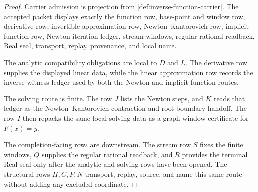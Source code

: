 \begin{proof}
Carrier admission is projection from \autoref{def:inverse-function-carrier}. The accepted packet displays exactly the function row, base-point and window row, derivative row, invertible approximation row, Newton--Kantorovich row, implicit-function row, Newton-iteration ledger, stream windows, regular rational readback, Real seal, transport, replay, provenance, and local name.

The analytic compatibility obligations are local to $D$ and $L$. The derivative row supplies the displayed linear data, while the linear approximation row records the inverse-witness ledger used by both the Newton and implicit-function routes.

The solving route is finite. The row $J$ lists the Newton steps, and $K$ reads that ledger as the Newton--Kantorovich contraction and root-boundary handoff. The row $I$ then repacks the same local solving data as a graph-window certificate for $F(x)=y$.

The completion-facing rows are downstream. The stream row $S$ fixes the finite windows, $Q$ supplies the regular rational readback, and $R$ provides the terminal Real seal only after the analytic and solving rows have been opened. The structural rows $H,C,P,N$ transport, replay, source, and name this same route without adding any excluded coordinate.
\end{proof}

